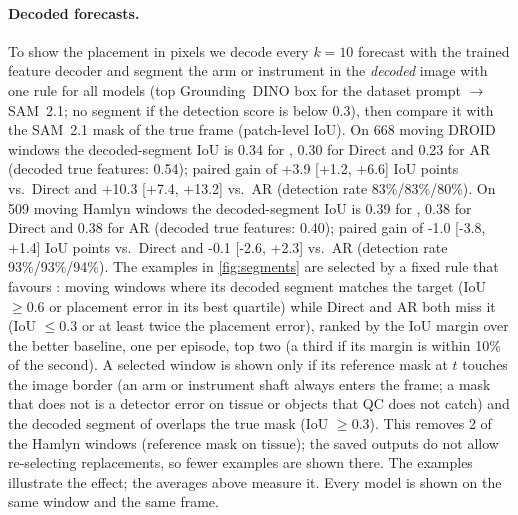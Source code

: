 \paragraph{Decoded forecasts.} To show the placement in pixels we decode every $k{=}10$ forecast with the trained feature decoder and segment the arm or instrument in the \emph{decoded} image with one rule for all models (top Grounding~DINO box for the dataset prompt $\rightarrow$ SAM~2.1; no segment if the detection score is below 0.3), then compare it with the SAM~2.1 mask of the true frame (patch-level IoU). On 668 moving DROID windows the decoded-segment IoU is 0.34 for \ours{}, 0.30 for Direct and 0.23 for AR (decoded true features: 0.54); paired gain of \ours{} +3.9 [+1.2, +6.6] IoU points vs.\ Direct and +10.3 [+7.4, +13.2] vs.\ AR (detection rate 83\%/83\%/80\%). On 509 moving Hamlyn windows the decoded-segment IoU is 0.39 for \ours{}, 0.38 for Direct and 0.38 for AR (decoded true features: 0.40); paired gain of \ours{} -1.0 [-3.8, +1.4] IoU points vs.\ Direct and -0.1 [-2.6, +2.3] vs.\ AR (detection rate 93\%/93\%/94\%). The examples in \cref{fig:segments} are selected by a fixed rule that favours \ours{}: moving windows where its decoded segment matches the target (IoU $\ge 0.6$ or placement error in its best quartile) while Direct and AR both miss it (IoU $\le 0.3$ or at least twice the placement error), ranked by the IoU margin over the better baseline, one per episode, top two (a third if its margin is within 10\% of the second). A selected window is shown only if its reference mask at $t$ touches the image border (an arm or instrument shaft always enters the frame; a mask that does not is a detector error on tissue or objects that QC does not catch) and the decoded segment of \ours{} overlaps the true mask (IoU $\ge 0.3$). This removes 2 of the Hamlyn windows (reference mask on tissue); the saved outputs do not allow re-selecting replacements, so fewer examples are shown there. The examples illustrate the effect; the averages above measure it. Every model is shown on the same window and the same frame.
